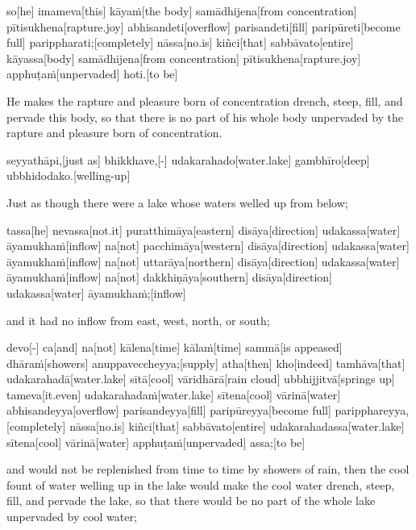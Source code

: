 \begin{samepage}
\begingl[glneveryline={\PaliGlossA,\PaliGlossB}]
so[he] imameva[this] kāyaṁ[the body] samādhijena[from concentration] pītisukhena[rapture.joy] abhisandeti[overflow] parisandeti[fill] paripūreti[become full] parippharati;[completely] nāssa[no.is] kiñci[that] sabbāvato[entire] kāyassa[body] samādhijena[from concentration] pītisukhena[rapture.joy] apphuṭaṁ[unpervaded] hoti.[to be]
\endgl
\nopagebreak
\linespread{0.5}
\begin{spacin}{0.2}
{\PaliGlossFT He makes the rapture and pleasure born of concentration drench, steep, fill, and pervade this body, so that there is no part of his whole body unpervaded by the rapture and pleasure born of concentration.}
\end{spacin}
\vskip 12pt
\end{samepage}
\begin{samepage}
\begingl[glneveryline={\PaliGlossA,\PaliGlossB}]
seyyathāpi,[just as] bhikkhave,[-] udakarahado[water.lake] gambhīro[deep] ubbhidodako.[welling-up]
\endgl
\nopagebreak
\linespread{0.5}
\begin{spacin}{0.2}
{\PaliGlossFT Just as though there were a lake whose waters welled up from below;}
\end{spacin}
\vskip 12pt
\end{samepage}
\begin{samepage}
\begingl[glneveryline={\PaliGlossA,\PaliGlossB}]
tassa[he] nevassa[not.it] puratthimāya[eastern] disāya[direction] udakassa[water] āyamukhaṁ[inflow] na[not] pacchimāya[western] disāya[direction] udakassa[water] āyamukhaṁ[inflow] na[not] uttarāya[northern] disāya[direction] udakassa[water] āyamukhaṁ[inflow] na[not] dakkhiṇāya[southern] disāya[direction] udakassa[water] āyamukhaṁ;[inflow]
\endgl
\nopagebreak
\linespread{0.5}
\begin{spacin}{0.2}
{\PaliGlossFT and it had no inflow from east, west, north, or south;}
\end{spacin}
\vskip 12pt
\end{samepage}
\begin{samepage}
\begingl[glneveryline={\PaliGlossA,\PaliGlossB}]
devo[-] ca[and] na[not] kālena[time] kālaṁ[time] sammā[is appeased] dhāraṁ[showers] anuppaveccheyya;[supply] atha[then] kho[indeed] tamhāva[that] udakarahadā[water.lake] sītā[cool] vāridhārā[rain cloud] ubbhijjitvā[springs up] tameva[it.even] udakarahadaṁ[water.lake] sītena[cool] vārinā[water] abhisandeyya[overflow] parisandeyya[fill] paripūreyya[become full] paripphareyya,[completely] nāssa[no.is] kiñci[that] sabbāvato[entire] udakarahadassa[water.lake] sītena[cool] vārinā[water] apphuṭaṁ[unpervaded] assa;[to be]
\endgl
\nopagebreak
\linespread{0.5}
\begin{spacin}{0.2}
{\PaliGlossFT and would not be replenished from time to time by showers of rain, then the cool fount of water welling up in the lake would make the cool water drench, steep, fill, and pervade the lake, so that there would be no part of the whole lake unpervaded by cool water;}
\end{spacin}
\vskip 12pt
\end{samepage}
